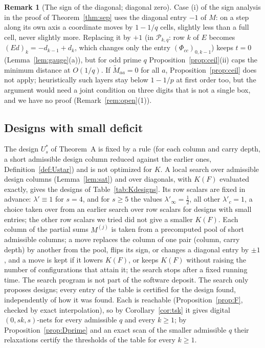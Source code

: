 \documentclass[11pt]{amsart}
\theoremstyle{definition}
\newtheorem{remark}[theorem]{Remark}
\theoremstyle{plain}
\begin{document}
\begin{remark}[The sign of the diagonal; diagonal zero]\label{rem:sign}\label{rem:diag0}
Case (i) of the sign analysis in the proof of Theorem~\ref{thm:sep} uses the diagonal entry $-1$ of $M$: on a step along its own axis a coordinate moves by $1-1/q$ cells, slightly less than a full cell, never slightly more. Replacing it by $+1$ (in $\mathcal P_{k,q}$: row $k$ of $E$ becomes $(Ed)_k=-d_{k-1}+d_k$, which changes only the entry $(\Phi_{cc})_{0,k-1}$) keeps $t=0$ (Lemma~\ref{lem:gauge}(a)), but for odd prime $q$ Proposition~\ref{prop:ceil}(ii) caps the minimum distance at $O(1/q)$. If $\tilde M_{aa}=0$ for all $a$, Proposition~\ref{prop:ceil} does not apply; heuristically such layers stay below $1-1/p$ at first order too, but the argument would need a joint condition on three digits that is not a single box, and we have no proof (Remark~\ref{rem:open}(1)).
\end{remark}

\subsection{Designs with small deficit}\label{sec:Kdesigns}
The design $U^*_s$ of Theorem~A is fixed by a rule (for each column and carry depth, a short admissible design column reduced against the earlier ones, Definition~\ref{def:Ustar}) and is not optimized for $K$. A local search over admissible design columns (Lemma~\ref{lem:sat}) and over diagonals, with $K(F)$ evaluated exactly, gives the designs of Table~\ref{tab:Kdesigns}. Its row scalars are fixed in advance: $\lambda'\equiv1$ for $s=4$, and for $s\ge5$ the values $\lambda'_\infty=\frac12$, all other $\lambda'_c=1$, a choice taken over from an earlier search over row scalars for designs with small entries; the other row scalars we tried did not give a smaller $K(F)$. Each column of the partial sums $M^{(j)}$ is taken from a precomputed pool of short admissible columns; a move replaces the column of one pair (column, carry depth) by another from the pool, flips its sign, or changes a diagonal entry by $\pm1$, and a move is kept if it lowers $K(F)$, or keeps $K(F)$ without raising the number of configurations that attain it; the search stops after a fixed running time. The search program is not part of the software deposit. The search only proposes designs; every entry of the table is certified for the design found, independently of how it was found. Each is reachable (Proposition~\ref{prop:F}, checked by exact interpolation), so by Corollary~\ref{cor:tsk} it gives digital $(0,sk,s)$-nets for every admissible $q$ and every $k\ge1$; by Proposition~\ref{prop:Dprime} and an exact scan of the smaller admissible $q$ their relaxations certify the thresholds of the table for every $k\ge1$.
\end{document}
